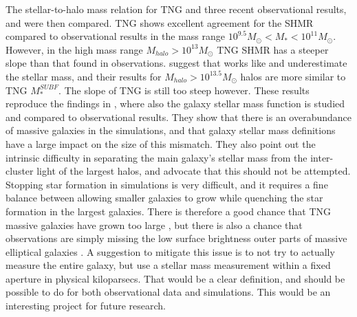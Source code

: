 The stellar-to-halo mass relation for TNG and three recent observational results, \textcite{Behroozi2019} and \textcite{Zanisi2019} were then compared. TNG shows excellent agreement for the SHMR compared to observational results in the mass range $10^{9.5} M_\odot < M_\ast < 10^{11} M_\odot$. However, in the high mass range $M_{halo} > 10^{13} M_\odot$ TNG SHMR has a steeper slope than that found in observations. \textcite{Kravtsov2018} suggest that works like \textcite{Behroozi2019} and \textcite{Zanisi2019} underestimate the stellar mass, and their results for $M_{halo} > 10^{13.5} M_\odot$ halos are more similar to TNG $M^{SUBF}_\ast$. The slope of TNG is still too steep however. These results reproduce the findings in \textcite{Pillepich2017}, where also the galaxy stellar mass function is studied and compared to observational results. They show that there is an overabundance of massive galaxies in the simulations, and that galaxy stellar mass definitions have a large impact on the size of this mismatch. They also point out the intrinsic difficulty in separating the main galaxy's stellar mass from the inter-cluster light of the largest halos, and advocate that this should not be attempted. Stopping star formation in simulations is very difficult, and it requires a fine balance between allowing smaller galaxies to grow while quenching the star formation in the largest galaxies. There is therefore a good chance that TNG massive galaxies have grown too large \parencite[as suggested by][]{Vazquez2020}, but there is also a chance that observations are simply missing the low surface brightness outer parts of massive elliptical galaxies \parencite[see e.g.,][]{DSouza2015}. A suggestion to mitigate this issue is to not try to actually measure the entire galaxy, but use a stellar mass measurement within a fixed aperture in physical kiloparsecs. That would be a clear definition, and should be possible to do for both observational data and simulations. This would be an interesting project for future research.


